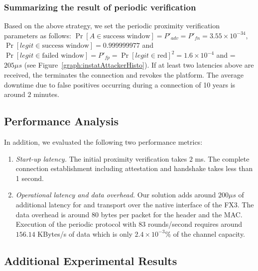 \subsubsection{Summarizing the result of \name periodic verification} 
Based on the above strategy, we set the periodic proximity verification parameters as follows: $\Pr[A \in \text{success window}]=P'_{adv} = P'_{fn}= 3.55\times 10^{-34}$, $\Pr[legit \in \text{success window}]=0.999999977$ and $\Pr[legit \in \text{failed window}]=P'_{fp}=\Pr[legit\in\text{red}]^2=1.6\times10^{-4}$ and \detach = $205 \mu s$ (see Figure~\ref{graph:instatAttackerHisto}). If at least two latencies above \detach are received, the \device terminates the connection and revokes the platform. The average downtime due to false positives occurring during a connection of 10 years is around $2$ minutes. 




\subsection{Performance Analysis}

In addition, we evaluated the following two performance metrics:

\begin{enumerate}
  \item \emph{Start-up latency.} The initial proximity verification takes $2$ ms. The complete connection establishment including attestation and \tls handshake takes less than 1 second.  
  


  \item \emph{Operational latency and data overhead.} Our solution adds around $200 \mu s$ of additional latency for \tls and transport over the native \usb interface of the FX3. The data overhead is around 80 bytes per packet for the header and the MAC. Execution of the periodic \name protocol with $83$ rounds/second requires around $156.14$ KBytes/s of data which is only $2.4 \times 10^{-3}$\% of the  channel capacity. 


\end{enumerate}


\subsection{Additional Experimental Results}


